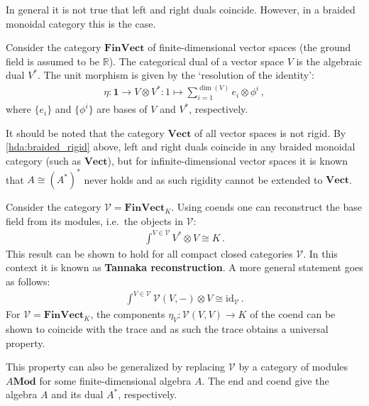     \begin{property}\label{hda:braided_rigid}
        In general it is not true that left and right duals coincide. However, in a braided monoidal category this is the case.
    \end{property}

    \begin{example}[FinVect]
        Consider the category $\mathbf{FinVect}$ of finite-dimensional vector spaces (the ground field is assumed to be $\mathbb{R}$). The categorical dual of a vector space $V$ is the algebraic dual $V^*$. The unit morphism is given by the `resolution of the identity':
        \begin{gather}
            \eta:\mathbf{1}\rightarrow V\otimes V^*:1\mapsto\sum_{i=1}^{\dim(V)}e_i\otimes\phi^i\,,
        \end{gather}
        where $\{e_i\}$ and $\{\phi^i\}$ are bases of $V$ and $V^*$, respectively.

        It should be noted that the category $\mathbf{Vect}$ of all vector spaces is not rigid. By \cref{hda:braided_rigid} above, left and right duals coincide in any braided monoidal category (such as $\mathbf{Vect}$), but for infinite-dimensional vector spaces it is known that $A\cong(A^*)^*$ never holds and as such rigidity cannot be extended to $\mathbf{Vect}$.
    \end{example}

    \begin{property}
        Consider the category $\mathcal{V}=\mathbf{FinVect}_K$. Using coends one can reconstruct the base field from its modules, i.e.~the objects in $\mathcal{V}$:
        \begin{gather}
            \int^{V\in\mathcal{V}}V^*\otimes V\cong K\,.
        \end{gather}
        This result can be shown to hold for all compact closed categories $\mathcal{V}$. In this context it is known as \textbf{Tannaka reconstruction}. A more general statement goes as follows:
        \begin{gather}
            \int^{V\in\mathcal{V}}\mathcal{V}(V,-)\otimes V\cong\mathrm{id}_{\mathcal{V}}\,.
        \end{gather}
        For $\mathcal{V}=\mathbf{FinVect}_K$, the components $\eta_V:\mathcal{V}(V,V)\rightarrow K$ of the coend can be shown to coincide with the trace and as such the trace obtains a universal property.
    \end{property}
    \begin{remark}
        This property can also be generalized by replacing $\mathcal{V}$ by a category of modules $A\mathbf{Mod}$ for some finite-dimensional algebra $A$. The end and coend give the algebra $A$ and its dual $A^*$, respectively.
    \end{remark}

